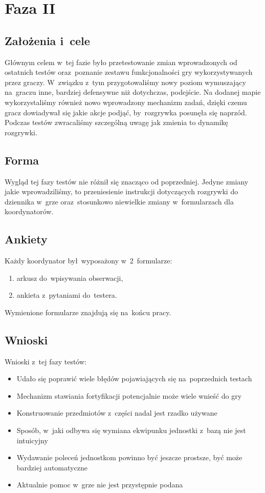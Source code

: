 \documentclass[licencjacka]{pracamgr}
\begin{document}
  \section{Faza II}

    \subsection{Założenia i~cele}
      Głównym celem w~tej fazie było przetestowanie zmian wprowadzonych od ostatnich testów oraz~poznanie zestawu funkcjonalności gry
      wykorzystywanych przez graczy. W~związku z~tym przygotowaliśmy nowy poziom wymuszający na~graczu inne, bardziej defensywne
      niż dotychczas, podejście. Na dodanej mapie wykorzystaliśmy również nowo wprowadzony mechanizm zadań, dzięki czemu gracz
      dowiadywał się jakie akcje podjąć, by~rozgrywka posunęła się naprzód. Podczas testów zwracaliśmy szczególną uwagę jak zmienia
      to dynamikę rozgrywki.

    \subsection{Forma}
      Wygląd tej fazy testów nie różnił się znacząco od poprzedniej. Jedyne zmiany jakie wprowadziliśmy,
      to przeniesienie instrukcji dotyczących rozgrywki do dziennika w~grze oraz~stosunkowo niewielkie zmiany
      w~formularzach dla koordynatorów.

    \subsection{Ankiety}
      Każdy koordynator był~wyposażony w~2~formularze:
      \begin{enumerate}
	\item arkusz do~wpisywania obserwacji,
	\item ankieta z~pytaniami do~testera.
      \end{enumerate}

      \noindent
      Wymienione formularze znajdują się na~końcu pracy.

    \subsection{Wnioski}
      Wnioski z~tej fazy testów:
      \begin{itemize}
	\item Udało się poprawić wiele błędów pojawiających się na~poprzednich testach
	\item Mechanizm stawiania fortyfikacji potencjalnie może wiele wnieść do gry
	\item Konstruowanie przedmiotów z~części nadal jest rzadko używane
	\item Sposób, w~jaki odbywa się wymiana ekwipunku jednostki z~bazą nie jest intuicyjny
	\item Wydawanie poleceń jednostkom powinno być jeszcze prostsze, być może bardziej automatyczne
	\item Aktualnie pomoc w~grze nie jest przystępnie podana
      \end{itemize}
\end{document}
